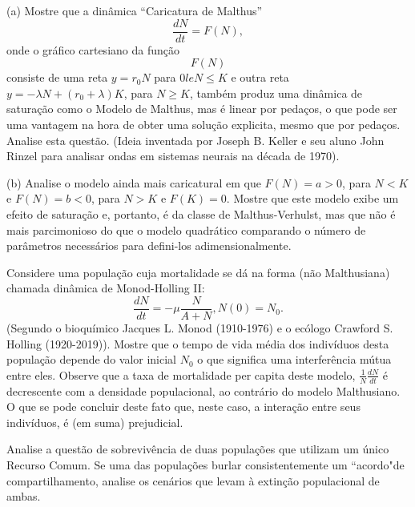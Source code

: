\begin{exercise}
\begin{description}
\item (a) Mostre que a dinâmica ``Caricatura de Malthus''
\[\dfrac{dN}{dt} =  F(N),\]
onde o gráfico cartesiano da função \[F(N)\] consiste de uma reta \(y = r_0 N\) para \(0 le N \le K\) e outra reta \(y =-\lambda N + (r_0 + \lambda) K\), para \(N \ge K\), também produz uma dinâmica de saturação como o Modelo de Malthus, mas é linear por pedaços, o que pode ser uma vantagem na hora de obter uma solução explicita, mesmo que por pedaços. Analise esta questão. (Ideia inventada por Joseph B. Keller e seu aluno John Rinzel para analisar ondas em sistemas neurais na década de 1970).
\item (b) Analise o modelo ainda mais caricatural em que \(F(N) = a > 0\), para \(N < K\) e \(F(N) = b < 0\), para \(N > K\) e \(F(K) = 0\). Mostre que este modelo exibe um efeito de saturação e, portanto, é da classe de Malthus-Verhulst, mas que não é mais parcimonioso do que o modelo quadrático comparando o número de parâmetros necessários para defini-los adimensionalmente.
\end{description}
\end{exercise}

\begin{exercise}
Considere uma população cuja mortalidade se dá na forma (não Malthusiana) chamada dinâmica de Monod-Holling II:
\[\dfrac{dN}{dt} = -\mu \dfrac{N}{A+N}, N(0) = N_0.\]
(Segundo o bioquímico Jacques L. Monod (1910-1976) e o ecólogo Crawford S. Holling (1920-2019)). Mostre que o tempo de vida média dos indivíduos desta população depende do valor inicial \(N_0\) o que significa uma interferência mútua entre eles. Observe que a taxa de mortalidade per capita deste modelo, \(\frac{1}{N} \frac{dN}{dt}\) é decrescente com a densidade populacional, ao contrário do modelo Malthusiano. O que se pode concluir deste fato que, neste caso, a interação entre seus indivíduos, é (em suma) prejudicial.
\end{exercise}

 
 

\begin{exercise}
Analise a questão de sobrevivência de duas populações que utilizam um único Recurso Comum. Se uma das populações burlar consistentemente um ``acordo"de compartilhamento, analise os cenários que levam à extinção populacional de ambas.
\end{exercise}




